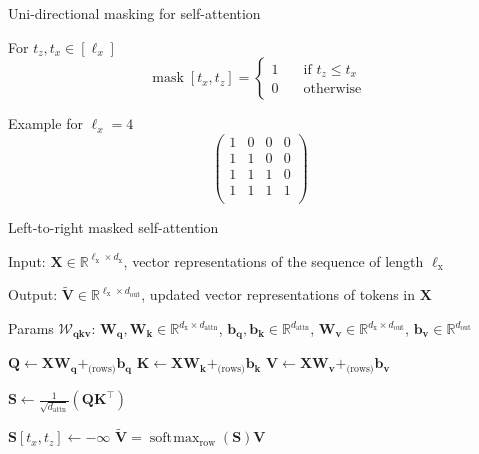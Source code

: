 \documentclass[12pt,aspectratio=169,handout]{beamer}
\DeclareMathOperator*{\softmax}{soft\!\max}
\DeclareMathOperator*{\mask}{mask}
\begin{document}
\begin{frame}{Uni-directional masking for self-attention}

For $t_z, t_x \in [\ell_x]$
$$
\mask[t_x, t_z] =
 \begin{cases}
	1       & \quad \text{if } t_z \leq t_x \\
	0  & \quad \text{otherwise }
\end{cases}
$$


Example for $\ell_x = 4$
$$
\begin{pmatrix}
1 & 0 & 0 & 0 \\
1 & 1 & 0 & 0 \\
1 & 1 & 1 & 0 \\
1 & 1 & 1 & 1 \\
\end{pmatrix}
$$

\end{frame}


\begin{frame}{Left-to-right masked self-attention}
	
	\begin{minipage}[t][10cm][t]{15cm}
		
		Input: $\bm{X} \in \mathbb{R}^{\ell_{\text{x}} \times d_{\text{x}}}$, vector representations of the sequence of length $\ell_{\text{x}}$
		
		Output: $\bm{\tilde{V}} \in \mathbb{R}^{\ell_{\text{x}} \times d_{\text{out}}}$, updated vector representations of tokens in $\bm{X}$
		
		Params $\bm{\mathcal{W}_{qkv}}$: $\bm{W_q}, \bm{W_k} \in \mathbb{R}^{d_\text{x} \times d_\text{attn}}$, $\bm{b_q}, \bm{b_k} \in \mathbb{R}^{d_\text{attn}}$, $\bm{W_v} \in \mathbb{R}^{d_\text{x} \times d_\text{out}}$, $ \bm{b_v} \in \mathbb{R}^{d_\text{out}}$
		
		\begin{algorithmic}[1]
			\State $\bm{Q} \gets \bm{X} \bm{W_q} +_{\text{(rows)}} \bm{b_q}$
			\State $\bm{K} \gets \bm{X} \bm{W_k} +_{\text{(rows)}} \bm{b_k}$
			\State $\bm{V} \gets \bm{X} \bm{W_v} +_{\text{(rows)}} \bm{b_v}$
			
			\State $\bm{S} \gets \frac{1}{\sqrt{d_{\text{attn}}}} (\bm{Q} \bm{K}^\top)$

			\If{$\neg \mask[t_x, t_z]$}
				 $\bm{S}[t_x, t_z] \gets - \infty$
			\EndIf
			\EndFor
			\State \Return $\bm{\tilde V} = \softmax_{\text{row}}(\bm{S}) \bm{V}$
			
			\EndFunction
		\end{algorithmic}
		
	\end{minipage}
\end{frame}
\end{document}
